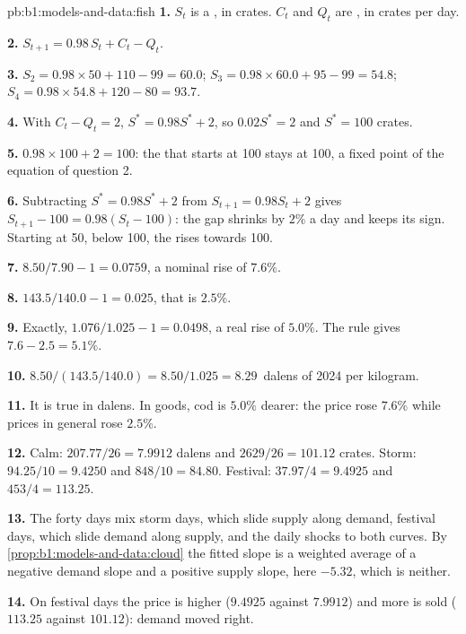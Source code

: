 \begin{solution}{pb:b1:models-and-data:fish}
\textbf{1.} $S_t$ is a , in crates. $C_t$ and $Q_t$ are , in crates
per day.

\textbf{2.} $S_{t+1} = 0.98\,S_t + C_t - Q_t$.

\textbf{3.} $S_2 = 0.98 \times 50 + 110 - 99 = 60.0$;
$S_3 = 0.98 \times 60.0 + 95 - 99 = 54.8$;
$S_4 = 0.98 \times 54.8 + 120 - 80 = 93.7$.

\textbf{4.} With $C_t - Q_t = 2$, $S^* = 0.98 S^* + 2$, so $0.02 S^* = 2$ and
$S^* = 100$ crates.

\textbf{5.} $0.98 \times 100 + 2 = 100$: the  that starts at 100 stays
at 100, a fixed point of the equation of question 2.

\textbf{6.} Subtracting $S^* = 0.98 S^* + 2$ from $S_{t+1} = 0.98 S_t + 2$
gives $S_{t+1} - 100 = 0.98(S_t - 100)$: the gap shrinks by $2\%$ a day and
keeps its sign. Starting at 50, below 100, the  rises towards 100.

\textbf{7.} $8.50/7.90 - 1 = 0.0759$, a nominal rise of $7.6\%$.

\textbf{8.} $143.5/140.0 - 1 = 0.025$, that is $2.5\%$.

\textbf{9.} Exactly, $1.076/1.025 - 1 = 0.0498$, a real rise of $5.0\%$.
The rule gives $7.6 - 2.5 = 5.1\%$.

\textbf{10.} $8.50/(143.5/140.0) = 8.50/1.025 = \num{8.29}$~dalens of 2024 per kilogram.

\textbf{11.} It is true in dalens. In goods, cod is $5.0\%$ dearer: the
price rose $7.6\%$ while prices in general rose $2.5\%$.

\textbf{12.} Calm: $207.77/26 = 7.9912$ dalens and $2629/26 = 101.12$ crates.
Storm: $94.25/10 = 9.4250$ and $848/10 = 84.80$. Festival:
$37.97/4 = 9.4925$ and $453/4 = 113.25$.

\textbf{13.} The forty days mix storm days, which slide supply along
demand, festival days, which slide demand along supply, and the daily
shocks to both curves. By \cref{prop:b1:models-and-data:cloud} the fitted
slope is a weighted average of a negative demand slope and a positive
supply slope, here $-5.32$, which is neither.

\textbf{14.} On festival days the price is higher ($9.4925$ against $7.9912$)
and more is sold ($113.25$ against $101.12$): demand moved right.


\end{solution}
